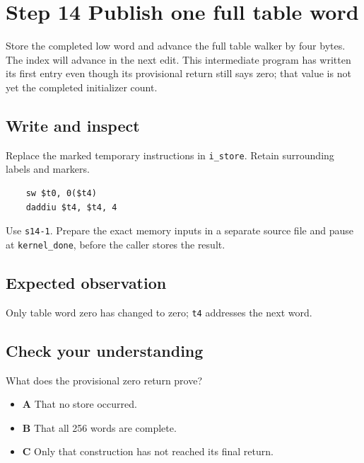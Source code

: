 \section{Step 14 Publish one full table word}\label{crc-s14}

Store the completed low word and advance the full table walker by four bytes. The index will advance in the next edit. This intermediate program has written its first entry even though its provisional return still says zero; that value is not yet the completed initializer count.

\subsection{Write and inspect}
Replace the marked temporary instructions in \texttt{i\_store}. Retain surrounding labels and markers.

\begin{verbatim}
    sw $t0, 0($t4)
    daddiu $t4, $t4, 4
\end{verbatim}

Use \texttt{s14-1}. Prepare the exact memory inputs in a separate source file and pause at \texttt{kernel\_done}, before the caller stores the result.

\subsection{Expected observation}
Only table word zero has changed to zero; \texttt{t4} addresses the next word.

\subsection{Check your understanding}
What does the provisional zero return prove?

\begin{itemize}
  \item \textbf{A} That no store occurred.
  \item \textbf{B} That all 256 words are complete.
  \item \textbf{C} Only that construction has not reached its final return.
\end{itemize}
